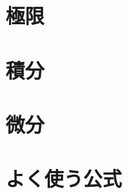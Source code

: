         \section{極限}
        

        \section{積分}
        

        \section{微分}
        

        \section{よく使う公式}
        
